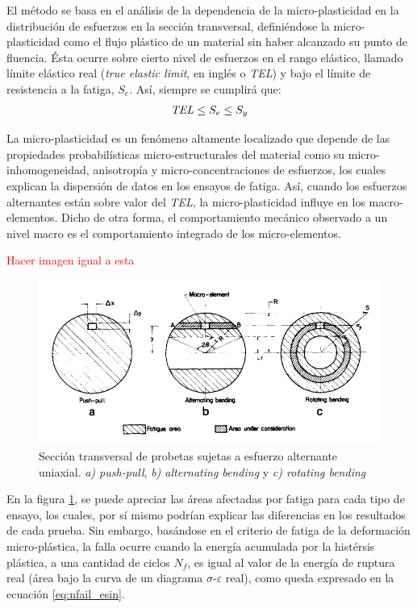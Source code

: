 El método se basa en el análisis de la dependencia de la micro-plasticidad en la distribución de esfuerzos en la sección transversal, definiéndose la micro-plasticidad como el flujo plástico de un material sin haber alcanzado su punto de fluencia. Ésta ocurre sobre cierto nivel de esfuerzos en el rango elástico, llamado límite elástico real (\textit{true elastic limit}, en inglés o \textit{TEL}) y bajo el límite de resistencia a la fatiga, $S_e$. Así, siempre se cumplirá que:
\begin{align*}
	\text{\textit{TEL}} \leq S_e \leq S_y
\end{align*}

La micro-plasticidad es un fenómeno altamente localizado que depende de las propiedades probabilísticas micro-estructurales del material como su micro-inhomogeneidad, anisotropía y micro-concentraciones de esfuerzos, los cuales explican la dispersión de datos en los ensayos de fatiga. Así, cuando los esfuerzos alternantes están sobre valor del  \textit{TEL}, la micro-plasticidad influye en los macro-elementos. Dicho de otra forma, el comportamiento mecánico observado a un nivel macro es el comportamiento integrado de los micro-elementos.

\textcolor{red}{Hacer imagen igual a esta}
\begin{figure}[h]
\centering
\includegraphics[scale=1]{Imagenes/affectedarea_fatigue.pdf}
\caption{Sección transversal de probetas sujetas a esfuerzo alternante uniaxial. \textit{a) push-pull}, \textit{b) alternating bending} y \textit{c) rotating bending}}
\label{fig:affar_fat}
\end{figure}

En la figura \ref{fig:affar_fat}, se puede apreciar las áreas afectadas por fatiga para cada tipo de ensayo, los cuales, por sí mismo podrían explicar las diferencias en los resultados de cada prueba. Sin embargo, basándose en el criterio de fatiga de la deformación micro-plástica, la falla ocurre cuando la energía acumulada por la histérsis plástica, a una cantidad de ciclos $N_f$, es igual al valor de la energía de ruptura real (área bajo la curva de un diagrama $\sigma$-$\varepsilon$ real), como queda expresado en la ecuación \ref{eq:nfail_esin}.

